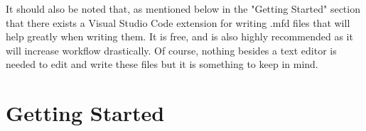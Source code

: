 \documentclass[]{article}%
\begin{document}
It should also be noted that, as mentioned below in the "Getting Started" section that there exists a Visual Studio Code extension for writing .mfd files that will help greatly when writing them. It is free, and is also highly recommended as it will increase workflow drastically. Of course, nothing besides a text editor is needed to edit and write these files but it is something to keep in mind.


\section{Getting Started}




\end{document}

